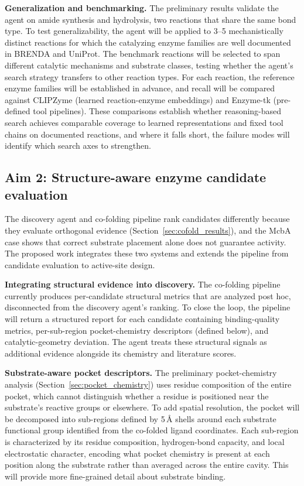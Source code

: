 \documentclass[12pt]{article}
\begin{document}
\textbf{Generalization and benchmarking.} The preliminary results validate the agent on amide synthesis and hydrolysis, two reactions that share the same bond type. To test generalizability, the agent will be applied to 3--5 mechanistically distinct reactions for which the catalyzing enzyme families are well documented in BRENDA and UniProt. The benchmark reactions will be selected to span different catalytic mechanisms and substrate classes, testing whether the agent's search strategy transfers to other reaction types. For each reaction, the reference enzyme families will be established in advance, and recall will be compared against CLIPZyme\cite{mikhael2024clipzyme} (learned reaction-enzyme embeddings) and Enzyme-tk\cite{mora2026enzymetk} (pre-defined tool pipelines). These comparisons establish whether reasoning-based search achieves comparable coverage to learned representations and fixed tool chains on documented reactions, and where it falls short, the failure modes will identify which search axes to strengthen.

\subsection{Aim 2: Structure-aware enzyme candidate evaluation}

The discovery agent and co-folding pipeline rank candidates differently because they evaluate orthogonal evidence (Section~\ref{sec:cofold_results}), and the McbA case shows that correct substrate placement alone does not guarantee activity. The proposed work integrates these two systems and extends the pipeline from candidate evaluation to active-site design.

\textbf{Integrating structural evidence into discovery.} The co-folding pipeline currently produces per-candidate structural metrics that are analyzed post hoc, disconnected from the discovery agent's ranking. To close the loop, the pipeline will return a structured report for each candidate containing binding-quality metrics, per-sub-region pocket-chemistry descriptors (defined below), and catalytic-geometry deviation. The agent treats these structural signals as additional evidence alongside its chemistry and literature scores.

\textbf{Substrate-aware pocket descriptors.} The preliminary pocket-chemistry analysis (Section~\ref{sec:pocket_chemistry}) uses residue composition of the entire pocket, which cannot distinguish whether a residue is positioned near the substrate's reactive groups or elsewhere. To add spatial resolution, the pocket will be decomposed into sub-regions defined by 5\,\AA{} shells around each substrate functional group identified from the co-folded ligand coordinates. Each sub-region is characterized by its residue composition, hydrogen-bond capacity, and local electrostatic character, encoding what pocket chemistry is present at each position along the substrate rather than averaged across the entire cavity. This will provide more fine-grained detail about substrate binding.
\end{document}
